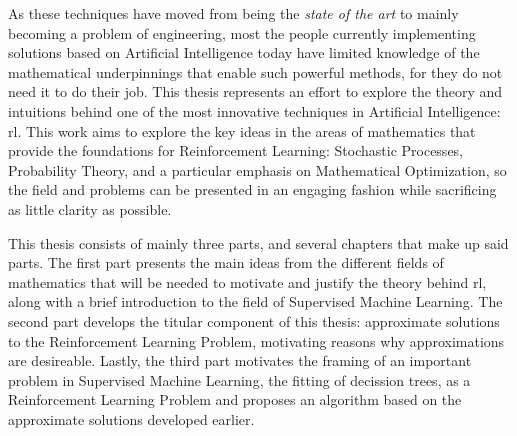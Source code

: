As these techniques have moved from being the \textit{state of the art} to
mainly becoming a problem of engineering, most the people currently implementing
solutions based on Artificial Intelligence today have limited knowledge of the
mathematical underpinnings that enable such powerful methods, for they do not 
need it to do their job. This thesis represents an effort to explore the theory
and intuitions behind one of the most innovative techniques in Artificial
Intelligence: \acf{rl}. This work aims to explore the key ideas in
the areas of mathematics that provide the foundations for Reinforcement
Learning: Stochastic Processes, Probability Theory, and a particular emphasis on
Mathematical Optimization, so the field and problems can be presented in an
engaging fashion while sacrificing as little clarity as possible.

This thesis consists of mainly three parts, and several chapters that make up
said parts. The first part presents the main ideas from the different fields of
mathematics that will be needed to motivate and justify the theory behind
\ac{rl}, along with a brief introduction to the field of Supervised Machine
Learning. The second part develops the titular component of this thesis:
approximate solutions to the Reinforcement Learning Problem, motivating reasons
why approximations are desireable. Lastly, the third part motivates the framing
of an important problem in Supervised Machine Learning, the fitting of decission
trees, as a Reinforcement Learning Problem and proposes an algorithm based on
the approximate solutions developed earlier.